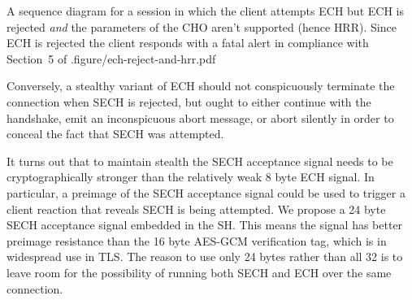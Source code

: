     {
    A sequence diagram for a session in which the client attempts \ac{ECH} but \ac{ECH} is rejected {\em and} the parameters of the \ac{CHO} aren't supported (hence \ac{HRR}).
    Since \ac{ECH} is rejected the client responds with a fatal  alert in compliance with Section~5 of \cite{esni}.}{figure/ech-reject-and-hrr.pdf}

Conversely, a stealthy variant of \ac{ECH} should not conspicuously terminate the connection when \ac{SECH} is rejected,
but ought to either continue with the handshake, emit an inconspicuous abort message, or abort silently in order to conceal the fact that \ac{SECH} was attempted.

It turns out that to maintain stealth the \ac{SECH} acceptance signal
needs to be cryptographically stronger than the
relatively weak 8 byte \ac{ECH} signal.
In particular, a preimage of the \ac{SECH} acceptance signal
could be used to trigger a client reaction that reveals \ac{SECH} is being attempted.
We propose a 24 byte \ac{SECH} acceptance signal embedded in the \ac{SH}.
This means the signal has better preimage resistance
than the 16 byte \ac{AES}-\ac{GCM} verification tag, 
which is in widespread use in \ac{TLS}.
The reason to use only 24 bytes rather than all 32 is to leave room for the possibility of running both \ac{SECH} and \ac{ECH} over the same connection.


